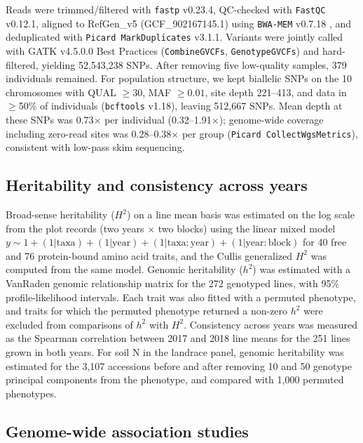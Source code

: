 \documentclass[11pt]{article}
\begin{document}
Reads were trimmed/filtered with \texttt{fastp} v0.23.4, QC-checked with \texttt{FastQC} v0.12.1, aligned to RefGen\_v5 (GCF\_902167145.1) using \texttt{BWA-MEM} v0.7.18 \citep{Li2013BWAMEM}, and deduplicated with \texttt{Picard MarkDuplicates} v3.1.1. Variants were jointly called with GATK v4.5.0.0 \citep{McKenna2010GATK} Best Practices (\texttt{CombineGVCFs}, \texttt{GenotypeGVCFs}) and hard-filtered, yielding 52,543,238 SNPs. After removing five low-quality samples, 379 individuals remained. For population structure, we kept biallelic SNPs on the 10 chromosomes with QUAL $\ge 30$, MAF $\ge 0.01$, site depth 221--413, and data in $\ge$50\% of individuals (\texttt{bcftools} v1.18), leaving 512,667 SNPs. Mean depth at these SNPs was 0.73$\times$ per individual (0.32--1.91$\times$); genome-wide coverage including zero-read sites was 0.28--0.38$\times$ per group (\texttt{Picard CollectWgsMetrics}), consistent with low-pass skim sequencing.

\subsection*{Heritability and consistency across years}
Broad-sense heritability ($H^2$) on a line mean basis was estimated on the log scale from the plot records (two years $\times$ two blocks) using the linear mixed model $y \sim 1 + (1|\mathrm{taxa}) + (1|\mathrm{year}) + (1|\mathrm{taxa{:}year}) + (1|\mathrm{year{:}block})$ for 40 free and 76 protein-bound amino acid traits, and the Cullis generalized $H^2$ was computed from the same model. Genomic heritability ($h^2$) was estimated with a VanRaden genomic relationship matrix for the 272 genotyped lines, with 95\% profile-likelihood intervals. Each trait was also fitted with a permuted phenotype, and traits for which the permuted phenotype returned a non-zero $h^2$ were excluded from comparisons of $h^2$ with $H^2$. Consistency across years was measured as the Spearman correlation between 2017 and 2018 line means for the 251 lines grown in both years. For soil N in the landrace panel, genomic heritability was estimated for the 3,107 accessions before and after removing 10 and 50 genotype principal components from the phenotype, and compared with 1,000 permuted phenotypes.

\subsection*{Genome-wide association studies}
\end{document}
